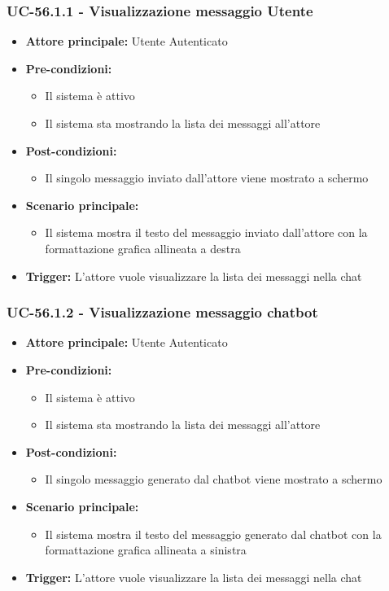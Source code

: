 \documentclass[a4paper,12pt]{article}
\newcommand{\ignoreglossary}{}
\begin{document}
\subsubsection{UC-56.1.1 - Visualizzazione messaggio \ignoreglossary{Utente}} \label{subsec:UC-56.1.1}
\begin{itemize}
    \item \textbf{Attore principale:} Utente Autenticato
    \item \textbf{Pre-condizioni:} 
    \begin{itemize}
        \item Il sistema è attivo
        \item Il sistema sta mostrando la lista dei messaggi all'attore
    \end{itemize}
    \item \textbf{Post-condizioni:}
    \begin{itemize}
        \item Il singolo messaggio inviato dall'attore viene mostrato a schermo
    \end{itemize}
    \item \textbf{Scenario principale:} 
    \begin{itemize}
        \item Il sistema mostra il testo del messaggio inviato dall'attore con la formattazione grafica allineata a destra
    \end{itemize}
    \item \textbf{Trigger:} L'attore vuole visualizzare la lista dei messaggi nella chat
\end{itemize}

\subsubsection{UC-56.1.2 - Visualizzazione messaggio chatbot} \label{subsec:UC-56.1.2}
\begin{itemize}
    \item \textbf{Attore principale:} Utente Autenticato
    \item \textbf{Pre-condizioni:} 
    \begin{itemize}
        \item Il sistema è attivo
        \item Il sistema sta mostrando la lista dei messaggi all'attore
    \end{itemize}
    \item \textbf{Post-condizioni:}
    \begin{itemize}
        \item Il singolo messaggio generato dal chatbot viene mostrato a schermo
    \end{itemize}
    \item \textbf{Scenario principale:} 
    \begin{itemize}
        \item Il sistema mostra il testo del messaggio generato dal chatbot con la formattazione grafica allineata a sinistra
    \end{itemize}
    \item \textbf{Trigger:} L'attore vuole visualizzare la lista dei messaggi nella chat
\end{itemize}
\end{document}
